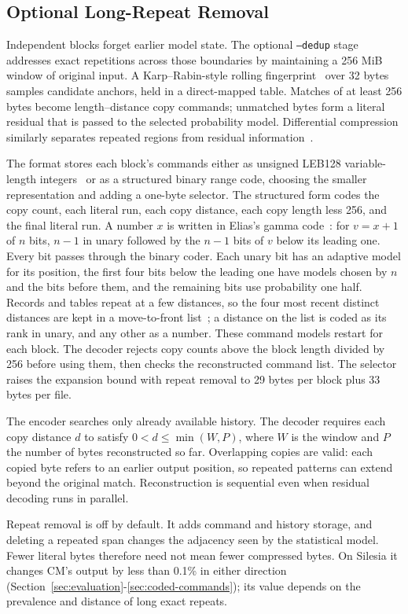 \documentclass[10pt,letterpaper]{article}
\newcommand{\code}[1]{\texttt{#1}}
\begin{document}
\subsection{Optional Long-Repeat Removal}
Independent blocks forget earlier model state. The optional \code{--dedup} stage addresses exact repetitions across those boundaries by maintaining a 256 MiB window of original input. A Karp--Rabin-style rolling fingerprint~\cite{karp} over 32 bytes samples candidate anchors, held in a direct-mapped table. Matches of at least 256 bytes become length--distance copy commands; unmatched bytes form a literal residual that is passed to the selected probability model. Differential compression similarly separates repeated regions from residual information~\cite{ajtai}.

The format stores each block's commands either as unsigned LEB128 variable-length integers~\cite[Sec.~7.6]{dwarf} or as a structured binary range code, choosing the smaller representation and adding a one-byte selector. The structured form codes the copy count, each literal run, each copy distance, each copy length less 256, and the final literal run. A number $x$ is written in Elias's gamma code~\cite{elias}: for $v=x+1$ of $n$ bits, $n-1$ in unary followed by the $n-1$ bits of $v$ below its leading one. Every bit passes through the binary coder. Each unary bit has an adaptive model for its position, the first four bits below the leading one have models chosen by $n$ and the bits before them, and the remaining bits use probability one half. Records and tables repeat at a few distances, so the four most recent distinct distances are kept in a move-to-front list~\cite{bstw}; a distance on the list is coded as its rank in unary, and any other as a number. These command models restart for each block. The decoder rejects copy counts above the block length divided by 256 before using them, then checks the reconstructed command list. The selector raises the expansion bound with repeat removal to 29 bytes per block plus 33 bytes per file.

The encoder searches only already available history. The decoder requires each copy distance $d$ to satisfy $0<d\leq\min(W,P)$, where $W$ is the window and $P$ the number of bytes reconstructed so far. Overlapping copies are valid: each copied byte refers to an earlier output position, so repeated patterns can extend beyond the original match. Reconstruction is sequential even when residual decoding runs in parallel.

Repeat removal is off by default. It adds command and history storage, and deleting a repeated span changes the adjacency seen by the statistical model. Fewer literal bytes therefore need not mean fewer compressed bytes. On Silesia it changes CM's output by less than 0.1\% in either direction (Section~\ref{sec:evaluation}-\ref{sec:coded-commands}); its value depends on the prevalence and distance of long exact repeats.
\end{document}
